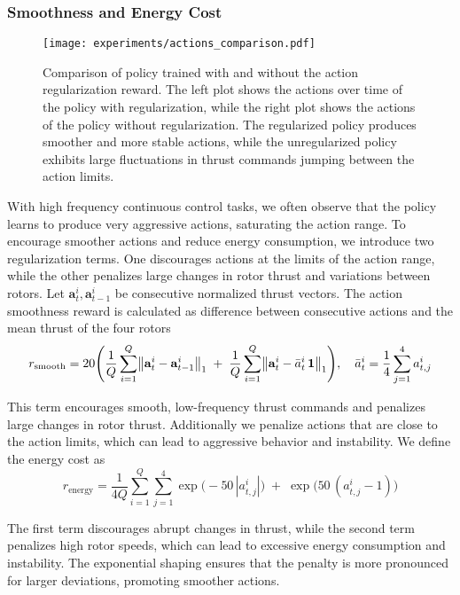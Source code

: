\subsubsection{Smoothness and Energy Cost}
\begin{figure}[ht]
    \centering
    \texttt{[image: experiments/actions\_comparison.pdf]}
    \caption[Action regularization]{Comparison of policy trained with and without the action regularization reward. The left plot shows the actions over time of the policy with regularization, while the right plot shows the actions of the policy without regularization. The regularized policy produces smoother and more stable actions, while the unregularized policy exhibits large fluctuations in thrust commands jumping between the action limits.}
    \label{fig:actions_comparison}  
\end{figure}
With high frequency continuous control tasks, we often observe that the policy learns to produce very aggressive actions, saturating the action range. To encourage smoother actions and reduce energy consumption, we introduce two regularization terms. One discourages actions at the limits of the action range, while the other penalizes large changes in rotor thrust and variations between rotors. Let \(\mathbf{a}_t^i,\mathbf{a}_{t-1}^i\) be consecutive normalized thrust vectors. The action smoothness reward is calculated as difference between consecutive actions and the mean thrust of the four rotors
\begin{equation}
r_{\rm smooth} = 20
\Biggl(
\frac{1}{Q}\sum_{i=1}^Q \bigl\lVert \mathbf{a}_t^i - \mathbf{a}_{t-1}^i \bigr\rVert_1
\;+\;
\frac{1}{Q}\sum_{i=1}^Q \bigl\lVert \mathbf{a}_t^i - \bar a_t^i\,\mathbf{1}\bigr\rVert_1
\Biggr), \quad \bar a_t^i = \frac{1}{4}\sum_{j=1}^4 a_{t,j}^i
\end{equation}

This term encourages smooth, low-frequency thrust commands and penalizes large changes in rotor thrust. Additionally we penalize actions that are close to the action limits, which can lead to aggressive behavior and instability. We define the energy cost as
\begin{equation}
r_{\mathrm{energy}} = \frac{1}{4Q}
\sum_{i=1}^{Q}\sum_{j=1}^{4}\exp\bigl(-50\,|a_{t,j}^i|\bigr)\;+\;\exp\bigl(50\,(a_{t,j}^i-1)\bigr)
\end{equation}

The first term discourages abrupt changes in thrust, while the second term penalizes high rotor speeds, which can lead to excessive energy consumption and instability. The exponential shaping ensures that the penalty is more pronounced for larger deviations, promoting smoother actions. 

